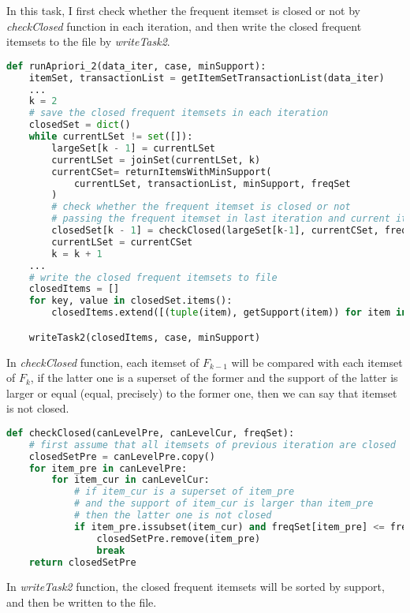 \documentclass[a4paper, oneside, final, 12pt]{scrartcl} %
\begin{document}
\begingroup
\raggedright

In this task, I first check whether the frequent itemset is closed or not by \emph{checkClosed}
function in each iteration, 
and then write the closed frequent itemsets to the file by \emph{writeTask2}.

\begin{lstlisting}[language=Python]
  def runApriori_2(data_iter, case, minSupport):
    itemSet, transactionList = getItemSetTransactionList(data_iter)
    ...
    k = 2
    # save the closed frequent itemsets in each iteration
    closedSet = dict()
    while currentLSet != set([]):    
        largeSet[k - 1] = currentLSet
        currentLSet = joinSet(currentLSet, k)
        currentCSet= returnItemsWithMinSupport(
            currentLSet, transactionList, minSupport, freqSet
        )
        # check whether the frequent itemset is closed or not
        # passing the frequent itemset in last iteration and current iteration
        closedSet[k - 1] = checkClosed(largeSet[k-1], currentCSet, freqSet)
        currentLSet = currentCSet
        k = k + 1
    ...
    # write the closed frequent itemsets to file
    closedItems = []
    for key, value in closedSet.items():
        closedItems.extend([(tuple(item), getSupport(item)) for item in value])

    writeTask2(closedItems, case, minSupport)
\end{lstlisting}

In \emph{checkClosed} function, each itemset of $F_{k-1}$ will be compared with
each itemset of $F_{k}$, if the latter one is a superset of the former and
the support of the latter is larger or equal (equal, precisely) to the former one, 
then we can say that itemset is not closed.

\begin{lstlisting}[language=Python]
  def checkClosed(canLevelPre, canLevelCur, freqSet):
    # first assume that all itemsets of previous iteration are closed
    closedSetPre = canLevelPre.copy()
    for item_pre in canLevelPre:
        for item_cur in canLevelCur:
            # if item_cur is a superset of item_pre
            # and the support of item_cur is larger than item_pre
            # then the latter one is not closed
            if item_pre.issubset(item_cur) and freqSet[item_pre] <= freqSet[item_cur]:
                closedSetPre.remove(item_pre)
                break
    return closedSetPre
\end{lstlisting}

In \emph{writeTask2} function, the closed frequent itemsets will be sorted by support,
and then be written to the file.
\end{document}
